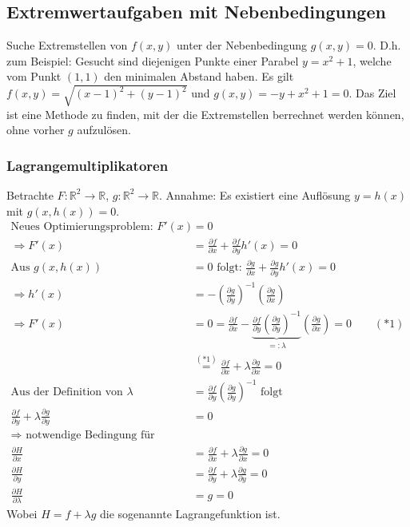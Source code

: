 \documentclass[12pt,a4paper]{article}%
\numberwithin{equation}{section}
\newcommand{\R}{\mathbb{R}} %
\newcommand{\diffp}{\partial}
\numberwithin{equation}{subsection}
\begin{document}
  \subsection{Extremwertaufgaben mit Nebenbedingungen}
  Suche Extremstellen von $f(x,y)$ unter der Nebenbedingung $g(x,y) = 0$.
  D.h. zum Beispiel: Gesucht sind diejenigen Punkte einer Parabel $y = x^2+1$, welche vom Punkt $(1,1)$ den minimalen Abstand haben. Es gilt $f(x,y) = \sqrt{(x-1)^2+(y-1)^2}$ und $g(x,y) = -y+x^2+1 = 0$.\newline
  Das Ziel ist eine Methode zu finden, mit der die Extremstellen berrechnet werden können, ohne vorher $g$ aufzulösen.
  \subsubsection{Lagrangemultiplikatoren}
  Betrachte $F:\R^2 \rightarrow \R$, $g:\R^2 \rightarrow \R$.\newline
  Annahme: Es existiert eine Auflösung $y = h(x)$ mit $g(x,h(x)) = 0$.\newline
  \begin{align*}
    \text{Neues Optimierungsproblem: } F'(x) &= 0 \\
    \Rightarrow F'(x) &= \frac{\diffp f}{\diffp x} + \frac{\diffp f}{\diffp y} h'(x) = 0\\
    \text{Aus } g(x,h(x)) &= 0 \text{ folgt: } \frac{\diffp g}{\diffp x} + \frac{\diffp g}{\diffp y} h'(x) = 0 \\
    \Rightarrow h'(x) &= -\left(\frac{\diffp g}{\diffp y}\right)^{-1} \left(\frac{\diffp g}{\diffp x}\right)\\
    \Rightarrow F'(x) &= 0 = \frac{\diffp f}{\diffp x} - \underbrace{\frac{\diffp f}{\diffp y}\left(\frac{\diffp g}{\diffp y}\right)^{-1}}_{=: \lambda} \left(\frac{\diffp g}{\diffp x}\right) = 0 \qquad (*1)\\
    &\overset{(*1)}{=} \frac{\diffp f}{\diffp x} + \lambda \frac{\diffp g}{\diffp x} = 0\\
    \text{Aus der Definition von } \lambda &= \frac{\diffp f}{\diffp y}\left(\frac{\diffp g}{\diffp y}\right)^{-1} \text{ folgt} \\
    \frac{\diffp f}{\diffp y} + \lambda \frac{\diffp g}{\diffp y} &= 0 \\
    \Rightarrow \text{ notwendige Bedingung für Extremum} \\
    \frac{\diffp H}{\diffp x} &= \frac{\diffp f}{\diffp x} + \lambda \frac{\diffp g}{\diffp x} = 0\\
    \frac{\diffp H}{\diffp y} &= \frac{\diffp f}{\diffp y} + \lambda \frac{\diffp g}{\diffp y} = 0\\
    \frac{\diffp H}{\diffp \lambda} &= g = 0
  \end{align*}
  Wobei $H = f + \lambda g$ die sogenannte Lagrangefunktion ist.
  
\end{document}
